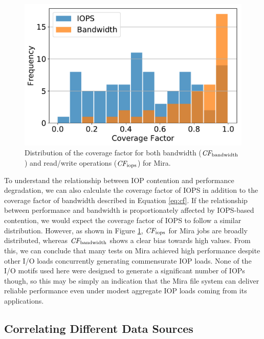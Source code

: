 \documentclass[conference,10pt,compsocconf]{IEEEtran}
\begin{document}
\begin{figure}[t]
    \centering
    \includegraphics[width=\columnwidth]{figs/hist-cf-bw-and-ops.pdf}
    \caption{Distribution  of the coverage factor for both bandwidth ($\textit{CF}_{\textup{bandwidth}}$) and read/write operations ($\textit{CF}_{\textup{iops}}$) for Mira.
    }
    \label{fig:hist-cf-mira}
\end{figure}

To understand the relationship between IOP contention and performance degradation, we can also calculate the coverage factor of IOPS in addition to the coverage factor of bandwidth described in Equation \ref{eq:cf}.  If the relationship between performance and bandwidth is proportionately affected by IOPS-based contention, we would expect the coverage factor of IOPS to follow a similar distribution.  However, as shown in Figure \ref{fig:hist-cf-mira}, $\textit{CF}_{\textup{iops}}$ for Mira jobs are broadly distributed, whereas $\textit{CF}_{\textup{bandwidth}}$ shows a clear bias towards high values.  From this, we can conclude that many tests on Mira achieved high performance despite other I/O loads concurrently generating commensurate IOP loads.  None of the I/O motifs used here were designed to generate a significant number of IOPs though, so this may be simply an indication that the Mira file system can deliver reliable performance even under modest aggregate IOP loads coming from its applications.

\subsection{Correlating Different Data Sources} \label{sec:results/correlating}
\end{document}
